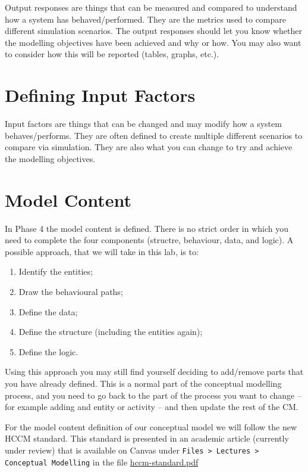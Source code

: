 \documentclass[
  10pt,
  a4paperpaper,
  DIV=11,
  numbers=noendperiod,
  oneside]{scrreprt}
\providecommand{\tightlist}{%
  \setlength{\itemsep}{0pt}\setlength{\parskip}{0pt}}\usepackage{longtable,booktabs,array}
\begin{document}
Output responses are things that can be measured and compared to
understand how a system has behaved/performed. They are the metrics used
to compare different simulation scenarios. The output responses should
let you know whether the modelling objectives have been achieved and why
or how. You may also want to consider how this will be reported (tables,
graphs, etc.).

\section{Defining Input Factors}\label{defining-input-factors}

Input factors are things that can be changed and may modify how a system
behaves/performs. They are often defined to create multiple different
scenarios to compare via simulation. They are also what you can change
to try and achieve the modelling objectives.

\section{Model Content}\label{model-content}

In Phase 4 the model content is defined. There is no strict order in
which you need to complete the four components (structre, behaviour,
data, and logic). A possible approach, that we will take in this lab, is
to:

\begin{enumerate}
\def\labelenumi{\arabic{enumi}.}
\tightlist
\item
  Identify the entities;
\item
  Draw the behavioural paths;
\item
  Define the data;
\item
  Define the structure (including the entities again);
\item
  Define the logic.
\end{enumerate}

Using this approach you may still find yourself deciding to add/remove
parts that you have already defined. This is a normal part of the
conceptual modelling process, and you need to go back to the part of the
process you want to change -- for example adding and entity or activity
-- and then update the rest of the CM.

For the model content definition of our conceptual model we will follow
the new HCCM standard. This standard is presented in an academic article
(currently under review) that is available on Canvas under
\texttt{Files > Lectures > Conceptual Modelling} in the file
\href{https://canvas.auckland.ac.nz/courses/113292/files/folder/Lectures/Conceptual\%20Modelling?preview=12376819}{hccm-standard.pdf}
\end{document}
